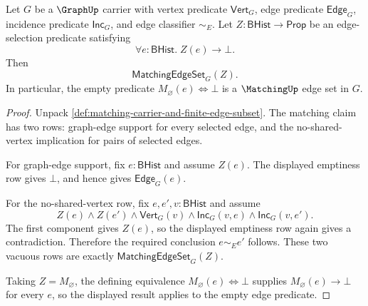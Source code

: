 \begin{theorem}
\label{thm:empty-edge-predicate-is-matching}
Let $G$ be a $\GraphUp$ carrier with vertex predicate $\mathsf{Vert}_G$, edge predicate $\mathsf{Edge}_G$, incidence predicate $\mathsf{Inc}_G$, and edge classifier $\sim_E$. Let $Z:\mathsf{BHist}\to\mathsf{Prop}$ be an edge-selection predicate satisfying
$$
\forall e:\mathsf{BHist}.\;Z(e)\to\bot.
$$
Then
$$
\mathsf{MatchingEdgeSet}_G(Z).
$$
In particular, the empty predicate $M_\varnothing(e)\Longleftrightarrow\bot$ is a $\MatchingUp$ edge set in $G$.
\end{theorem}
\begin{proof}
Unpack \autoref{def:matching-carrier-and-finite-edge-subset}. The matching claim has two rows: graph-edge support for every selected edge, and the no-shared-vertex implication for pairs of selected edges.

For graph-edge support, fix $e:\mathsf{BHist}$ and assume $Z(e)$. The displayed emptiness row gives $\bot$, and hence gives $\mathsf{Edge}_G(e)$.

For the no-shared-vertex row, fix $e,e',v:\mathsf{BHist}$ and assume
$$
Z(e)\land Z(e')\land\mathsf{Vert}_G(v)\land\mathsf{Inc}_G(v,e)\land\mathsf{Inc}_G(v,e').
$$
The first component gives $Z(e)$, so the displayed emptiness row again gives a contradiction. Therefore the required conclusion $e\sim_E e'$ follows. These two vacuous rows are exactly $\mathsf{MatchingEdgeSet}_G(Z)$.

Taking $Z=M_\varnothing$, the defining equivalence $M_\varnothing(e)\Longleftrightarrow\bot$ supplies $M_\varnothing(e)\to\bot$ for every $e$, so the displayed result applies to the empty edge predicate.
\end{proof}

